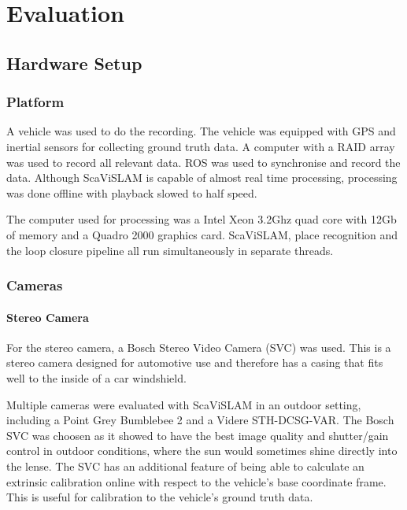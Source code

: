 \chapter{Evaluation}
\label{chapter:evaluation}


\section{Hardware Setup}

\subsection{Platform}

A vehicle was used to do the recording.  The vehicle was equipped with GPS and inertial sensors for collecting ground truth data.  A computer with a RAID array was used to record all relevant data.  ROS was used to synchronise and record the data.  Although ScaViSLAM is capable of almost real time processing, processing was done offline with playback slowed to half speed.

The computer used for processing was a Intel Xeon 3.2Ghz quad core with 12Gb of memory and a Quadro 2000 graphics card.  ScaViSLAM, place recognition and the loop closure pipeline all run simultaneously in separate threads.

\subsection{Cameras}

\subsubsection{Stereo Camera}

For the stereo camera, a Bosch Stereo Video Camera (SVC) was used.  This is a stereo camera designed for automotive use and therefore has a casing that fits well to the inside of a car windshield.  

Multiple cameras were evaluated with ScaViSLAM in an outdoor setting, including a Point Grey Bumblebee 2 and a Videre STH-DCSG-VAR.  The Bosch SVC was choosen as it showed to have the best image quality and shutter/gain control in outdoor conditions, where the sun would sometimes shine directly into the lense.  The SVC has an additional feature of being able to calculate an extrinsic calibration online with respect to the vehicle's base coordinate frame.  This is useful for calibration to the vehicle's ground truth data.

